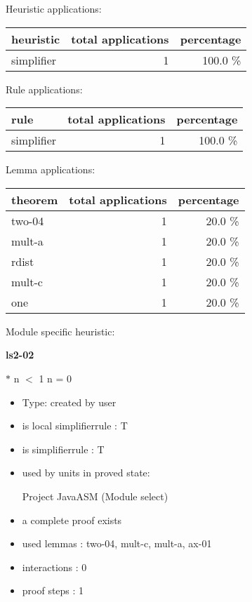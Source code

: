 \documentclass[a4paper]{article}
\begin{document}
\medskip


Heuristic applications:

\begin{supertabular}{l|r|r}
heuristic	& total applications & percentage \\ \hline
simplifier & 1 & 100.0 \% \\

\end{supertabular}

Rule applications:

\begin{supertabular}{l|r|r}
rule	        & total applications & percentage \\ \hline
simplifier & 1 & 100.0 \% \\

\end{supertabular}

Lemma applications:

\begin{supertabular}{l|r|r}
theorem	        & total applications & percentage \\ \hline
two-04 & 1 & 20.0 \% \\
mult-a & 1 & 20.0 \% \\
rdist & 1 & 20.0 \% \\
mult-c & 1 & 20.0 \% \\
one & 1 & 20.0 \% \\

\end{supertabular}

Module specific heuristic:

\pagebreak

{\LARGE\bf ls2-02}\label{lemma-ls2-02}

\medskip

  $*$ n $<$ 1 \Equiv n = 0

\begin{itemize}

\item Type: created by user

\item is local simplifierrule : T
\item is simplifierrule : T
\item used by units in proved state:

Project JavaASM (Module select)
\item       a complete proof exists
\item       used lemmas  : two-04, mult-c, mult-a, ax-01
\item       interactions : 0
\item       proof steps  : 1
\end{itemize}
\end{document}
